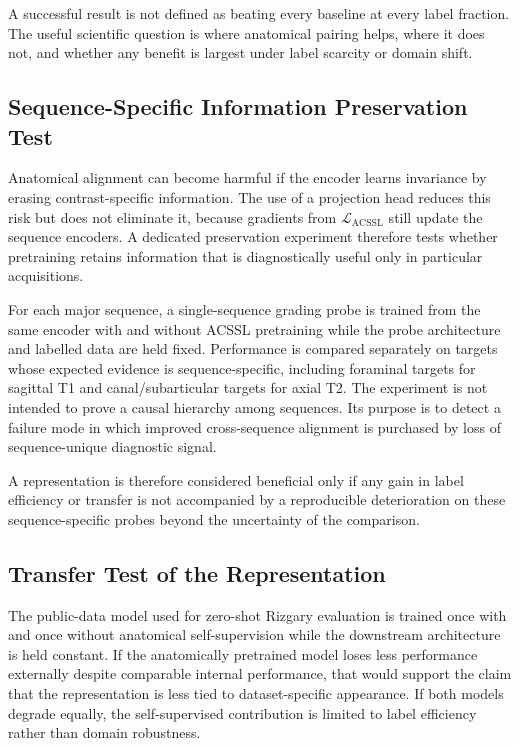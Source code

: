 A successful result is not defined as beating every baseline at every label
fraction. The useful scientific question is where anatomical pairing helps,
where it does not, and whether any benefit is largest under label scarcity or
domain shift.

\subsection{Sequence-Specific Information Preservation Test}
\label{sec:method-ssl-preservation}

Anatomical alignment can become harmful if the encoder learns invariance by
erasing contrast-specific information. The use of a projection head reduces
this risk but does not eliminate it, because gradients from
$\mathcal{L}_{\mathrm{ACSSL}}$ still update the sequence encoders. A dedicated
preservation experiment therefore tests whether pretraining retains information
that is diagnostically useful only in particular acquisitions.

For each major sequence, a single-sequence grading probe is trained from the
same encoder with and without ACSSL pretraining while the probe architecture and
labelled data are held fixed. Performance is compared separately on targets
whose expected evidence is sequence-specific, including foraminal targets for
sagittal T1 and canal/subarticular targets for axial T2. The experiment is not
intended to prove a causal hierarchy among sequences. Its purpose is to detect a
failure mode in which improved cross-sequence alignment is purchased by loss of
sequence-unique diagnostic signal.

A representation is therefore considered beneficial only if any gain in label
efficiency or transfer is not accompanied by a reproducible deterioration on
these sequence-specific probes beyond the uncertainty of the comparison.

\subsection{Transfer Test of the Representation}
\label{sec:method-ssl-transfer}

The public-data model used for zero-shot Rizgary evaluation is trained once with
and once without anatomical self-supervision while the downstream architecture
is held constant. If the anatomically pretrained model loses less performance
externally despite comparable internal performance, that would support the
claim that the representation is less tied to dataset-specific appearance. If
both models degrade equally, the self-supervised contribution is limited to
label efficiency rather than domain robustness.

